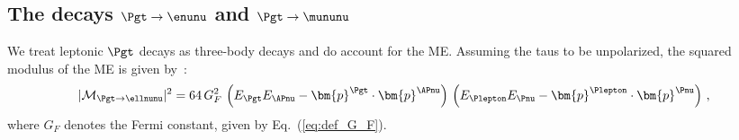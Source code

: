 \subsection{The decays $\Pgt \to \enunu$ and $\Pgt \to \mununu$}
\label{sec:appendix_tauToLepDecays}

We treat leptonic $\Pgt$ decays as three-body decays and do
account for the ME. Assuming the taus to be unpolarized,
the squared modulus of the ME is given by~\cite{Barger:1987nn}:
\begin{equation}
\vert\mathcal{M}_{\Pgt \to \ellnunu} \vert^{2} = 64 \, G^{2}_{F} \,
\left( E_{\Pgt} E_{\APnu} - \bm{p}^{\Pgt} \cdot \bm{p}^{\APnu} \right)
\, \left( E_{\Plepton} E_{\Pnu} - \bm{p}^{\Plepton} \cdot \bm{p}^{\Pnu} \right) \, , 
\label{eq:lepTauDecaysME}
\end{equation}
where $G_{F}$ denotes the Fermi constant, given by Eq.~(\ref{eq:def_G_F}).

